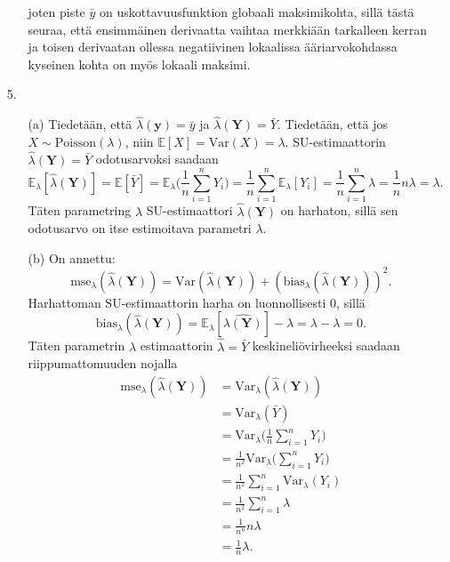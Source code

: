 \documentclass[12pt]{article}
\begin{document}
\begin{enumerate}
\begin{enumerate}
$$$$
joten piste $\bar{y}$ on uskottavuusfunktion globaali maksimikohta, sillä tästä seuraa, että ensimmäinen derivaatta vaihtaa merkkiään tarkalleen kerran ja toisen derivaatan ollessa negatiivinen lokaalissa ääriarvokohdassa kyseinen kohta on myös lokaali maksimi.
\end{enumerate}
\item[5.] 
\begin{enumerate}
\item[(a)] Tiedetään, että $\hat{\lambda}(\textbf{y}) = \bar{y}$ ja $\hat{\lambda}(\textbf{Y}) = \bar{Y}$.
Tiedetään, että jos $X \sim \text{Poisson}(\lambda)$, niin $\mathbb{E}[X] = \text{Var}(X) = \lambda.$ SU-estimaattorin $\hat{\lambda}(\textbf{Y}) = \bar{Y}$ odotusarvoksi saadaan
$$
\mathbb{E}_\lambda[\hat{\lambda}(\textbf{Y})] = \mathbb{E}[\bar{Y}] = \mathbb{E}_\lambda\Bigg( \frac{1}{n} \sum_{i=1}^n Y_i \Bigg) = \frac{1}{n} \sum_{i=1}^n \mathbb{E}_\lambda[Y_i] = \frac{1}{n} \sum_{i=1}^n \lambda = \frac{1}{n}n\lambda = \lambda.
$$
Täten parametring $\lambda$ SU-estimaattori $\hat{\lambda}(\textbf{Y})$ on harhaton, sillä sen odotusarvo on itse estimoitava parametri $\lambda$.
\item[(b)] On annettu:
$$
\text{mse}_\lambda(\hat{\lambda}(\textbf{Y})) = \text{Var}(\hat{\lambda}(\textbf{Y})) + (\text{bias}_\lambda(\hat{\lambda}(\textbf{Y})))^2.
$$
Harhattoman SU-estimaattorin harha on luonnollisesti 0, sillä
$$
\text{bias}_\lambda(\hat{\lambda}(\textbf{Y})) = \mathbb{E}_\lambda[\hat{\lambda(\textbf{Y})}] - \lambda = \lambda - \lambda = 0.
$$
Täten parametrin $\lambda$ estimaattorin $\hat{\lambda} = \bar{Y}$ keskineliövirheeksi saadaan riippumattomuuden nojalla
$$
\begin{aligned}
\text{mse}_\lambda(\hat{\lambda}(\textbf{Y})) &= \text{Var}_\lambda(\hat{\lambda}(\textbf{Y})) \\
    &= \text{Var}_\lambda(\bar{Y}) \\
    &= \text{Var}_\lambda\Bigg( \frac{1}{n} \sum_{i=1}^n Y_i \Bigg) \\
    &= \frac{1}{n^2} \text{Var}_\lambda\Bigg( \sum_{i = 1}^n Y_i \Bigg) \\
    &= \frac{1}{n^2} \sum_{i=1}^n \text{Var}_\lambda(Y_i) \\
    &= \frac{1}{n^2} \sum_{i=1}^n \lambda \\
    &= \frac{1}{n^n}n\lambda \\
    &= \frac{1}{n}\lambda.
\end{aligned}
$$
\end{enumerate}
\end{enumerate}
\end{document}
